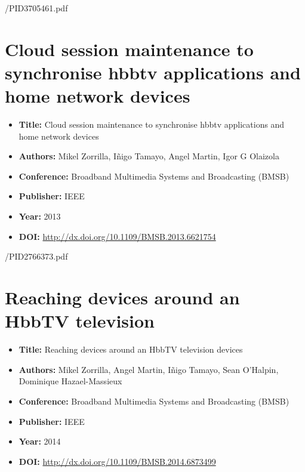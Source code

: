 \ifattachpapers
	 {\PublicationsPath/PID3705461.pdf}
\fi



\chapter[Cloud session synchronisation for hbbtv \& mobile devices]{Cloud session maintenance to synchronise hbbtv applications and home network devices}
\label{chap:BMSB2013}
\begin{itemize} \itemsep1pt\parskip0pt
	\item \textbf{Title:} Cloud session maintenance to synchronise hbbtv applications and home network devices
	\item \textbf{Authors:} Mikel Zorrilla, Iñigo Tamayo, Angel Martin, Igor G Olaizola	
	\item \textbf{Conference:} Broadband Multimedia Systems and Broadcasting (BMSB)
 	\item \textbf{Publisher:} IEEE
	\item \textbf{Year:} 2013
	\item \textbf{DOI:}  \url{http://dx.doi.org/10.1109/BMSB.2013.6621754}
\end{itemize}	
	

\ifattachpapers
	 {\PublicationsPath/PID2766373.pdf}
\fi



\chapter[Reaching devices around an HbbTV television]{Reaching devices around an HbbTV television}
\label{chap:BMSB2014}
\begin{itemize} \itemsep1pt\parskip0pt
	\item \textbf{Title:} Reaching devices around an HbbTV television devices
	\item \textbf{Authors:} Mikel Zorrilla, Angel Martin, Iñigo Tamayo, Sean O'Halpin, Dominique Hazael-Massieux	
	\item \textbf{Conference:} Broadband Multimedia Systems and Broadcasting (BMSB)
 	\item \textbf{Publisher:} IEEE
	\item \textbf{Year:} 2014
	\item \textbf{DOI:}  \url{http://dx.doi.org/10.1109/BMSB.2014.6873499}
\end{itemize}	
	

